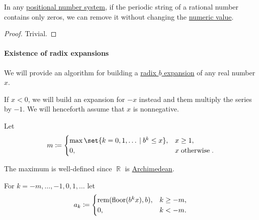 \begin{proposition}\label{thm:removing_periodic_digit_string}
  In any \hyperref[def:positional_number_system]{positional number system}, if the periodic string of a rational number contains only zeros, we can remove it without changing the \hyperref[def:positional_notation_as_radix_expansion/rational_numbers]{numeric value}.
\end{proposition}
\begin{proof}
  Trivial.
\end{proof}

\paragraph{Existence of radix expansions}

\begin{algorithm}\label{alg:real_number_radix_expansion}
  We will provide an algorithm for building a \hyperref[def:real_number_radix_expansion]{radix \( b \) expansion} of any real number \( x \).

  \begin{thmenum}
     If \( x < 0 \), we will build an expansion for \( -x \) instead and them multiply the series by \( -1 \). We will henceforth assume that \( x \) is nonnegative.

     Let
    \begin{equation}\label{eq:alg:real_number_radix_expansion/m}
      m \coloneqq \begin{cases}
        \max\set{ k = 0, 1, \ldots \given b^k \leq x }, &x \geq 1, \\
        0,                                              &x \T{otherwise}.
      \end{cases}
    \end{equation}

    The maximum is well-defined since \( \BbbR \) is \hyperref[def:archimedean_semiring]{Archimedean}.

     For \( k = -m, \ldots, -1, 0, 1, \ldots \) let
    \begin{equation}\label{eq:alg:real_number_radix_expansion/direct}
      a_k \coloneqq \begin{cases}
        \operatorname{rem}(\operatorname{floor}(b^k x), b), &k \geq -m, \\
        0,                      &k < -m.
      \end{cases}
    \end{equation}


\end{thmenum}
\end{algorithm}
